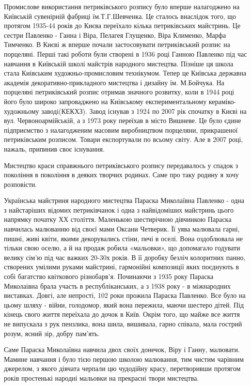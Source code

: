 Промислове використання петриківського розпису було вперше налагоджено на
Київській сувенірній фабриці їм.Т.Г.Шевченка. Це сталось внаслідок того, що
протягом 1935-44 років до Києва переїхало кілька петриківських майстринь. Це
сестри Павленко - Ганна і Віра, Пелагея Глущенко, Віра Клименко, Марфа
Тимченко. В Києві ж вперше почали застосовувати петриківський розпис на
порцеляні. Перші такі роботи були створені в 1936 році Ганною Павленко під
час навчання в Київській школі майстрів народного мистецтва. Пізніше ця школа
стала Киівським художньо-промисловим технікумом. Тепер це Київська державна
академія декоративно-прикладного мистецтва і дизайну їм. М.Бойчука. На
порцеляні петриківський розпис отримав значного розвитку, коли в 1944 році
його було широко запроваджено на Киівському експериментальному
кераміко-художньому заводі(КЕКХЗ). Завод існував з 1924 по 2007 рік спочатку
в Києві на вул. Червоноармійській, а з 1973 року переїхав в місто Вишневе. Це
було єдине підприємство з налагодженим масовим виробництвом порцеляни,
прикрашеної петриківським розписом. Товари експортували по всьому світу. Але
в 2007 році, нажаль, припинив своє існування. 

Мистецтво краси справжнього петриківського розпису передавалось у спадок з
покоління в покоління в деяких творчих родинах. Саме про таку родину я хочу
розповісти.

Українська майстриня народного мистецтва Параска Миколаївна Павленко - одна з
найстаріших відомих петриківчанок і одна з найвідоміших майстринь цього
напрямку початку ХХ століття. Маленькою шестирічною дівчинкою Параска
навчилась малюванню від своєї мами Оксани Четверик. Її уява малювала гарні,
пишні, живі квіти, якими декорувались стіни, печі в оселі. Вона оздоблювала
не тільки свою оселю, а й на продаж робила «мальовки», що допомагало годувати
велику сім'ю під час важких 20-30х років. В її доробку безліч колоритних
панно, створених умілими руками майстрині, гармонійні композиції яких
поєднують в собі багатство квіткового різнобарв'я. Починаючи з 1935 року
Параска Миколаівна брала участь в республіканських, а з 1938 року - в
міжнародних виставках. Довгі, але непрості, 102 роки прожила Параска
Павленко. Все було на цьому шляху - війни, голодомор, який вона пережила,
маючи шестеро дітей. Під кінець свого життя переїхала до дочок в Київ. Окрім
того, що майже все життя не випускала з рук пензлика, вона шила, вишивала,
гарно співала, мала гострий розум, ясний зір, добру пам'ять.

Саме Параска Миколаївна навчила двох своїх донечок, Віру і Ганну, малювати.
Мамине навчання і було тією першою школою малювання, тим чистим чарівним
джерелом, з якого дівчата черпали цю чудодійну красу, перетворивши протягом
років простенькі народні мальовки на прекрасні твори мистецтва.

